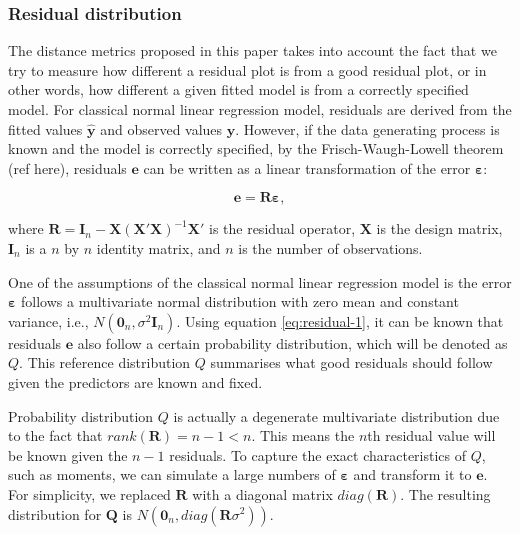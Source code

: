 \documentclass[]{interact}
\theoremstyle{plain}%
\theoremstyle{definition}
\theoremstyle{remark}
\begin{document}
\hypertarget{residual-distribution}{%
\subsubsection{Residual distribution}\label{residual-distribution}}

The distance metrics proposed in this paper takes into account the fact
that we try to measure how different a residual plot is from a good
residual plot, or in other words, how different a given fitted model is
from a correctly specified model. For classical normal linear regression
model, residuals are derived from the fitted values
\(\hat{\boldsymbol{y}}\) and observed values \(\boldsymbol{y}\).
However, if the data generating process is known and the model is
correctly specified, by the Frisch-Waugh-Lowell theorem (ref here),
residuals \(\boldsymbol{e}\) can be written as a linear transformation
of the error \(\boldsymbol{\varepsilon}\):

\begin{equation}
\label{eq:residual-1}
\boldsymbol{e} = \boldsymbol{R}\boldsymbol{\varepsilon},
\end{equation}

\noindent where
\(\boldsymbol{R}=\boldsymbol{I}_n -\boldsymbol{X}(\boldsymbol{X}'\boldsymbol{X})^{-1}\boldsymbol{X}'\)
is the residual operator, \(\boldsymbol{X}\) is the design matrix,
\(\boldsymbol{I}_n\) is a \(n\) by \(n\) identity matrix, and \(n\) is
the number of observations.

One of the assumptions of the classical normal linear regression model
is the error \(\boldsymbol{\varepsilon}\) follows a multivariate normal
distribution with zero mean and constant variance, i.e.,
\(N(\boldsymbol{0}_n,\sigma^2\boldsymbol{I}_n)\). Using equation
\ref{eq:residual-1}, it can be known that residuals \(\boldsymbol{e}\)
also follow a certain probability distribution, which will be denoted as
\(Q\). This reference distribution \(Q\) summarises what good residuals
should follow given the predictors are known and fixed.

Probability distribution \(Q\) is actually a degenerate multivariate
distribution due to the fact that \(rank(\boldsymbol{R}) = n - 1 < n\).
This means the \(n\)th residual value will be known given the \(n - 1\)
residuals. To capture the exact characteristics of \(Q\), such as
moments, we can simulate a large numbers of \(\boldsymbol{\varepsilon}\)
and transform it to \(\boldsymbol{e}\). For simplicity, we replaced
\(\boldsymbol{R}\) with a diagonal matrix \(diag(\boldsymbol{R})\). The
resulting distribution for \(\boldsymbol{Q}\) is
\(N(\boldsymbol{0}_n, diag(\boldsymbol{R}\sigma^2))\).
\end{document}

